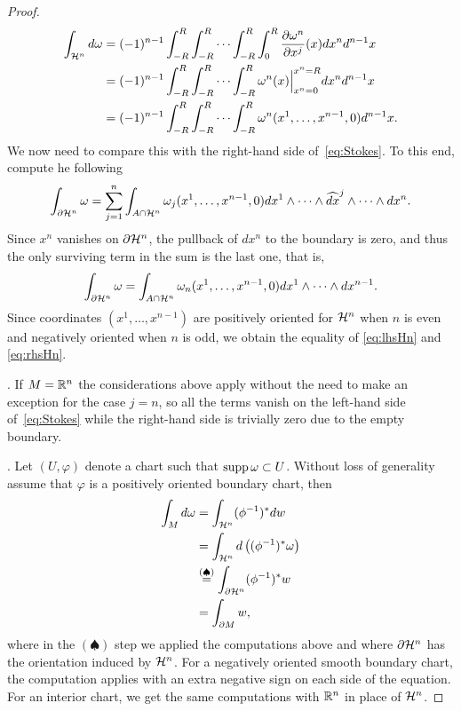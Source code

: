 \begin{proof}
  \begin{align}
    \int_{\cH^n} d\omega
     & =(-1)^{n-1} \int_{-R}^R\int_{-R}^R\cdots\int_{-R}^R\int_{0}^{R}\frac{\partial \omega^n}{\partial x^j}(x) dx^n d^{n-1} x \\ %
     & =(-1)^{n-1} \int_{-R}^R\int_{-R}^R\cdots\int_{-R}^R \omega^n(x)\Big|_{x^n=0}^{x^n=R} dx^n d^{n-1} x                     \\ %
     & =(-1)^{n-1} \int_{-R}^R\int_{-R}^R\cdots\int_{-R}^R \omega^n(x^1, \ldots, x^{n-1}, 0) d^{n-1} x                         %
    .\label{eq:lhsHn}
  \end{align}
  We now need to compare this with the right-hand side of~\eqref{eq:Stokes}.
  To this end, compute he following
  \begin{equation}
    \int_{\partial \mathcal{H}^n}\omega = \sum_{j=1}^n \int_{A\cap\mathcal{H}^n} \omega_j(x^1, \ldots, x^{n-1}, 0) dx^1 \wedge \cdots\wedge \widehat{dx}^j \wedge \cdots\wedge dx^n.
  \end{equation}
  Since $x^n$ vanishes on $\partial\mathcal{H}^n$, the pullback of $dx^n$ to the boundary is zero, and thus the only surviving term in the sum is the last one, that is,
  \begin{equation}\label{eq:rhsHn}
    \int_{\partial \mathcal{H}^n}\omega = \int_{A\cap\mathcal{H}^n} \omega_n(x^1, \ldots, x^{n-1}, 0) dx^1 \wedge\cdots\wedge dx^{n-1}.
  \end{equation}
  Since coordinates $(x^1, \ldots, x^{n-1})$ are positively oriented for $\mathcal{H}^n$ when $n$ is even and negatively oriented when $n$ is odd, we obtain the equality of \eqref{eq:lhsHn} and \eqref{eq:rhsHn}.

  .
  If $M=\mathbb{R}^n$ the considerations above apply without the need to make an exception for the case $j=n$, so all the terms vanish on the left-hand side of~\eqref{eq:Stokes} while the right-hand side is trivially zero due to the empty boundary.

  .
  Let $(U,\varphi)$ denote a chart such that $\operatorname{supp} \omega \subset U$.
  Without loss of generality assume that $\varphi$ is a positively oriented boundary chart, then
  \begin{align}
    \int_M d\omega
     & = \int_{\mathcal{H}^n}(\phi^{-1})^* dw                                 \\
     & = \int_{\mathcal{H}^n} d\left((\phi^{-1})^* \omega\right)              \\
     & \overset{(\spadesuit)}{=} \int_{\partial \mathcal{H}^n}(\phi^{-1})^* w \\
     & = \int_{\partial M} w ,
  \end{align}
  where in the $(\spadesuit)$ step we applied the computations above and where $\partial \mathcal{H}^n$ has the orientation induced by $\mathcal{H}^n$.
  For a negatively oriented smooth boundary chart, the computation applies with an extra negative sign on each side of the equation.
  For an interior chart, we get the same computations with $\mathbb{R}^n$ in place of $\mathcal{H}^n$.


\end{proof}
